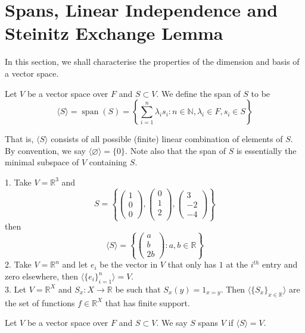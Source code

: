 \section{Spans, Linear Independence and Steinitz Exchange Lemma}
In this section, we shall characterise the properties of the dimension and basis of a vector space.
\begin{definition}
    Let $V$ be a vector space over $F$ and $S\subset V$.
    We define the span of $S$ to be
    $$\langle S\rangle=\operatorname{span}(S)=\left\{\sum_{i=1}^n\lambda_is_i:n\in\mathbb N,\lambda_i\in F,s_i\in S\right\}$$
\end{definition}
That is, $\langle S\rangle$ consists of all possible (finite) linear combination of elements of $S$.
By convention, we say $\langle \varnothing\rangle=\{0\}$.
Note also that the span of $S$ is essentially the minimal subspace of $V$ containing $S$.
\begin{example}
    1. Take $V=\mathbb R^3$ and
    $$S=\left\{\begin{pmatrix}
        1\\
        0\\
        0
    \end{pmatrix},\begin{pmatrix}
        0\\
        1\\
        2\\
    \end{pmatrix},\begin{pmatrix}
        3\\
        -2\\
        -4
    \end{pmatrix}\right\}$$
    then
    $$\langle S\rangle=\left\{\begin{pmatrix}
        a\\
        b\\
        2b
    \end{pmatrix}:a,b\in\mathbb R\right\}$$
    2. Take $V=\mathbb R^n$ and let $e_i$ be the vector in $V$ that only has $1$ at the $i^{th}$ entry and zero elsewhere, then $\langle \{e_i\}_{i=1}^n\rangle=V$.\\
    3. Let $V=\mathbb R^X$ and $S_x:X\to\mathbb R$ be such that $S_x(y)=1_{x=y}$.
    Then $\langle \{S_x\}_{x\in\mathbb R}\rangle$ are the set of functions $f\in\mathbb R^X$ that has finite support.
\end{example}
\begin{definition}
    Let $V$ be a vector space over $F$ and $S\subset V$.
    We say $S$ spans $V$ if $\langle S\rangle =V$.
\end{definition}
